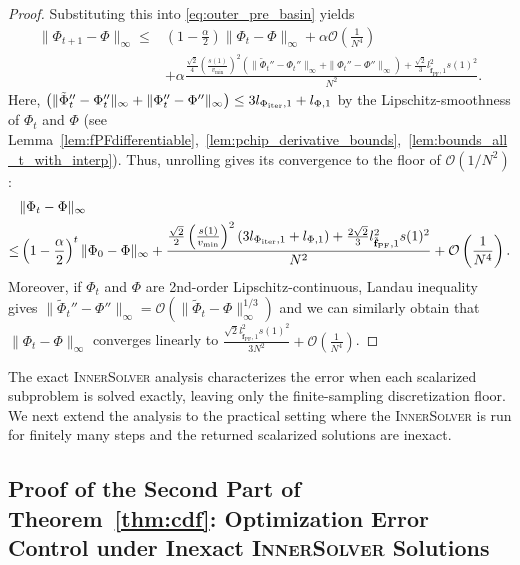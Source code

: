 \documentclass{article}
\newcommand{\Oc}{\mathcal{O}}
\newcommand{\f}{\mathbf{f}}
\newcommand{\Farc}{\Phi}
\begin{document}
\begin{proof}
Substituting this into \eqref{eq:outer_pre_basin} yields
\begin{align}
 \|\Farc_{t+1}-\Farc\|_\infty \le& \left(1-\frac{\alpha}{2}\right) \|\Farc_t-\Farc\|_\infty +\alpha \Oc\left(\frac{1}{N^4}\right) \nonumber\\
 & + \alpha \frac{\frac{\sqrt{2}}{4}\left(\frac{s(1)}{v_{\min}}\right)^2 \left(\|\tilde\Farc_t''-\Farc_t''\|_\infty+\|\Farc_t''-\Farc''\|_\infty\right) +\frac{\sqrt{2}}{3} l_{\tilde{\f}_{\mathrm{PF}},1}^2 s(1)^2}{N^2}.
\label{eq:delta_recursion_exact}
\end{align}
Here, $\left(\|\tilde\Farc_t''-\Farc_t''\|_\infty+\|\Farc_t''-\Farc''\|_\infty\right) \leq 3l_{\Farc_{\rm iter},1}+l_{\Farc,1}$ by the Lipschitz-smoothness of $\Phi_t$ and $\Phi$ (see Lemma~\ref{lem:fPFdifferentiable},~\ref{lem:pchip_derivative_bounds},~\ref{lem:bounds_all_t_with_interp}). Thus, unrolling gives its convergence to the floor of  $\Oc(1/N^2)$:
\begin{align}
 & \|\Farc_t-\Farc\|_\infty \nonumber \\
 \le&
 \left(1-\frac{\alpha}{2}\right)^t
 \|\Farc_0-\Farc\|_\infty+ \frac{\frac{\sqrt{2}}{2}\left(\frac{s(1)}{v_{\min}}\right)^2 (3l_{\Farc_{\rm iter},1}+l_{\Farc,1})+\frac{2\sqrt{2}}{3} l_{\tilde{\f}_{\mathrm{PF}},1}^2 s(1)^2}{N^2}+\Oc\left(\frac{1}{N^4}\right) .
 \label{eq:delta_unrolled_exact}
\end{align}
Moreover, if $\Phi_t$ and $\Phi$ are 2nd-order Lipschitz-continuous, Landau inequality~\citep{hardy1952inequalities} gives $\|\tilde\Farc_t''-\Farc''\|_\infty = \Oc(\|\tilde\Farc_t-\Farc\|_\infty^{1/3})$ and we can similarly obtain that $\|\Farc_t-\Farc\|_\infty $ converges linearly to $\frac{\sqrt{2}l_{\tilde{\f}_{\mathrm{PF}},1}^2 s(1)^2}{3N^2} + \Oc\left(\frac{1}{N^4}\right)$.
\end{proof}
The exact \textsc{InnerSolver} analysis characterizes the error when each scalarized subproblem is solved exactly, leaving only the finite-sampling discretization floor. We next extend the analysis to the practical setting where the \textsc{InnerSolver} is run for finitely many steps and the returned scalarized solutions are inexact.

\subsection{Proof of the Second Part of Theorem~\ref{thm:cdf}: Optimization Error Control under Inexact \textsc{InnerSolver} Solutions}
\label{appendix:cdf_inexact}
\end{document}
